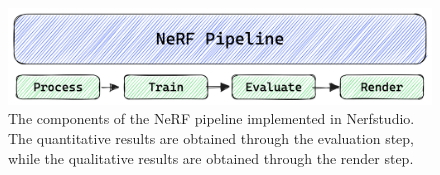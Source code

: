 \begin{figure}[!h]
    \centering
    \includegraphics[width=1.0\textwidth]{figures/nerfstudio-pipeline.png}
    \caption[The components of the NeRF pipeline implemented in Nerfstudio.]{The components of the NeRF pipeline implemented in Nerfstudio. The quantitative results are obtained through the evaluation step, while the qualitative results are obtained through the render step.}
    \label{fig:nerfstudio-pipeline}
\end{figure}